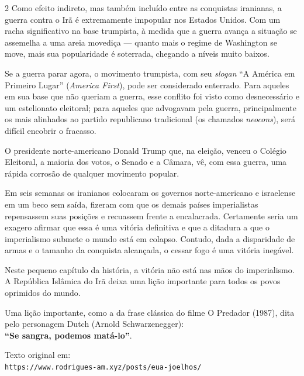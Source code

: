 \documentclass[a4paper,12pt]{article}
\begin{document}
\begin{multicols}{2}
Como efeito indireto, mas também incluído entre as conquistas iranianas, a guerra contra o Irã é extremamente impopular nos Estados Unidos. Com um racha significativo na base trumpista, à medida que a guerra avança a situação se assemelha a uma areia movediça — quanto mais o regime de Washington se move, mais sua popularidade é soterrada, chegando a níveis muito baixos.

Se a guerra parar agora, o movimento trumpista, com seu \emph{slogan} “A América em Primeiro Lugar” (\emph{America First}), pode ser considerado enterrado. Para aqueles em sua base que não queriam a guerra, esse conflito foi visto como desnecessário e um estelionato eleitoral; para aqueles que advogavam pela guerra, principalmente os mais alinhados ao partido republicano tradicional (os chamados \emph{neocons}), será difícil encobrir o fracasso.

O presidente norte-americano Donald Trump que, na eleição, venceu o Colégio Eleitoral, a maioria dos votos, o Senado e a Câmara, vê, com essa guerra, uma rápida corrosão de qualquer movimento popular.

Em seis semanas os iranianos colocaram os governos norte-americano e israelense em um beco sem saída, fizeram com que os demais países imperialistas repensassem suas posições e recuassem frente a encalacrada. Certamente seria um exagero afirmar que essa é uma vitória definitiva e que a ditadura a que o imperialismo submete o mundo está em colapso. Contudo, dada a disparidade de armas e o tamanho da conquista alcançada, o cessar fogo é uma vitória inegável.

Neste pequeno capítulo da história, a vitória não está nas mãos do imperialismo. A República Islâmica do Irã deixa uma lição importante para todos os povos oprimidos do mundo.

Uma lição importante, como a da frase clássica do filme O Predador (1987), dita pelo personagem Dutch (Arnold Schwarzenegger): \\
\textbf{“Se sangra, podemos matá-lo”}.
\hspace{1em}

\vspace{1em}
\footnotesize
Texto original em:\\
\texttt{https://www.rodrigues-am.xyz/posts/eua-joelhos/}

\end{multicols}
\end{document}
